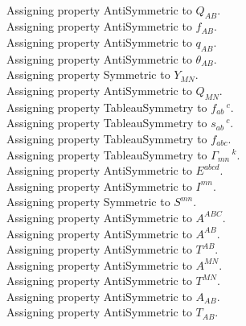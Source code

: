 \documentclass[11pt]{article}
\begin{document}
\\
Assigning property AntiSymmetric to ${Q}_{A B}$.
\\
Assigning property AntiSymmetric to ${f}_{A B}$.
\\
Assigning property AntiSymmetric to ${q}_{A B}$.
\\
Assigning property AntiSymmetric to ${\theta}_{A B}$.
\\
Assigning property Symmetric to ${Y}_{M N}$.
\\
Assigning property AntiSymmetric to ${Q}_{M N}$.
\\
Assigning property TableauSymmetry to ${f}_{a b}\,^{c}$.
\\
Assigning property TableauSymmetry to ${s}_{a b}\,^{c}$.
\\
Assigning property TableauSymmetry to ${f}_{a b c}$.
\\
Assigning property TableauSymmetry to ${\Gamma}_{m n}\,^{k}$.
\\
Assigning property AntiSymmetric to ${E}^{a b c d}$.
\\
Assigning property AntiSymmetric to ${I}^{m n}$.
\\
Assigning property Symmetric to ${S}^{m n}$.
\\
Assigning property AntiSymmetric to ${A}^{A B C}$.
\\
Assigning property AntiSymmetric to ${A}^{A B}$.
\\
Assigning property AntiSymmetric to ${T}^{A B}$.
\\
Assigning property AntiSymmetric to ${A}^{M N}$.
\\
Assigning property AntiSymmetric to ${T}^{M N}$.
\\
Assigning property AntiSymmetric to ${A}_{A B}$.
\\
Assigning property AntiSymmetric to ${T}_{A B}$.
\end{document}
